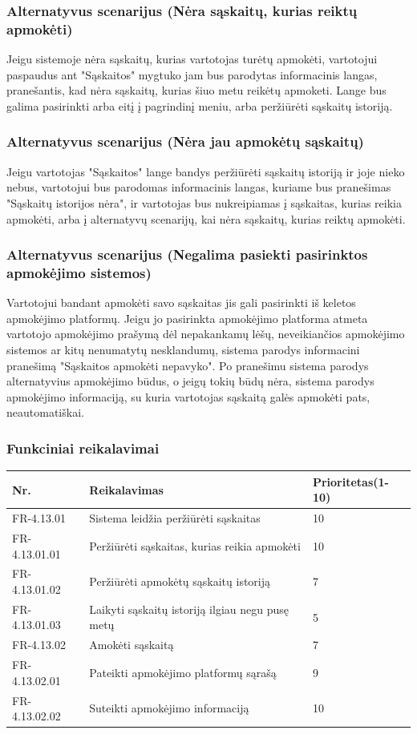 \documentclass[oneside]{VUMIFPSkursinis}
\begin{document}
	\subsubsection{Alternatyvus scenarijus (Nėra sąskaitų, kurias reiktų apmokėti)}
	Jeigu sistemoje nėra sąskaitų, kurias vartotojas turėtų apmokėti, vartotojui paspaudus ant "Sąskaitos" mygtuko jam bus parodytas informacinis langas, pranešantis, kad nėra sąskaitų, kurias šiuo metu reikėtų apmoketi. Lange bus galima pasirinkti arba eitį į pagrindinį meniu, arba peržiūrėti sąskaitų istoriją.
	\subsubsection{Alternatyvus scenarijus (Nėra jau apmokėtų sąskaitų)}
	Jeigu vartotojas "Sąskaitos" lange bandys peržiūrėti sąskaitų istoriją ir joje nieko nebus, vartotojui bus parodomas informacinis langas, kuriame bus pranešimas "Sąskaitų istorijos nėra", ir vartotojas bus nukreipiamas į sąskaitas, kurias reikia apmokėti, arba į alternatyvų scenarijų, kai nėra sąskaitų, kurias reiktų apmokėti.
	\subsubsection{Alternatyvus scenarijus (Negalima pasiekti pasirinktos apmokėjimo sistemos)}
	Vartotojui bandant apmokėti savo sąskaitas jis gali pasirinkti iš keletos apmokėjimo platformų. Jeigu jo pasirinkta apmokėjimo platforma atmeta vartotojo apmokėjimo prašymą dėl nepakankamų lėšų, neveikiančios apmokėjimo sistemos ar kitų nenumatytų nesklandumų, sistema parodys informacini pranešimą "Sąskaitos apmokėti nepavyko". Po pranešimu sistema parodys alternatyvius apmokėjimo būdus, o jeigų tokių būdų nėra, sistema parodys apmokėjimo informaciją, su kuria vartotojas sąskaitą galės apmokėti pats, neautomatiškai.
	\subsubsection{Funkciniai reikalavimai}
\begin{table}[htbp]
	\begin{tabularx}{1\textwidth}{ |P{2.5cm}|X|P{3cm }| }  \hline
		Nr. & Reikalavimas & Prioritetas(1-10) \\ \hline
		FR-4.13.01 & Sistema leidžia peržiūrėti sąskaitas & 10 \\ \hline
		FR-4.13.01.01& Peržiūrėti sąskaitas, kurias reikia apmokėti & 10 \\ \hline
		FR-4.13.01.02 & Peržiūrėti apmokėtų sąskaitų istoriją & 7 \\ \hline 
		FR-4.13.01.03 & Laikyti sąskaitų istoriją ilgiau negu pusę metų & 5 \\ \hline
		FR-4.13.02 & Amokėti sąskaitą & 7 \\ \hline
		FR-4.13.02.01 & Pateikti apmokėjimo platformų sąrašą & 9 \\ \hline
		FR-4.13.02.02 & Suteikti apmokėjimo informaciją & 10 \\ \hline
	\end{tabularx}
\end{table}
\end{document}
